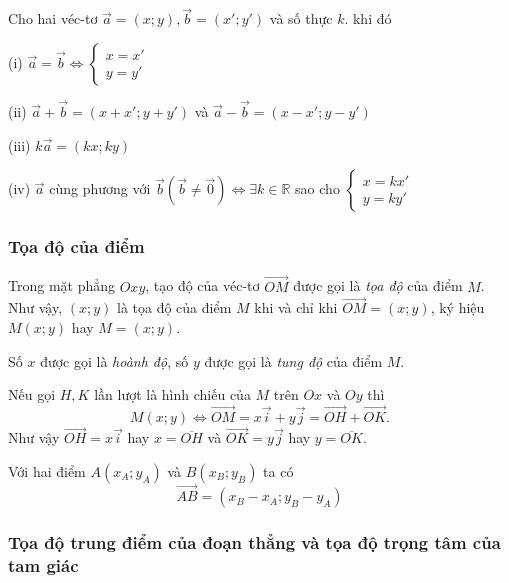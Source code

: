 \begin{dl}
	Cho hai véc-tơ $\overrightarrow{a}=(x;y), \overrightarrow{b}=(x';y')$ và số thực $k$. khi đó
	
	(i) $\overrightarrow{a}=\overrightarrow{b} \Leftrightarrow \begin{cases}
	x=x' \\ y=y'
	\end{cases}$
	
	(ii) $\overrightarrow{a}+ \overrightarrow{b}=(x+x';y+y')$ và $\overrightarrow{a}- \overrightarrow{b}=(x-x';y-y')$
	
	(iii) $k \overrightarrow{a} = (kx;ky)$
	
	(iv) $\overrightarrow{a}$ cùng phương với $\overrightarrow{b} (\overrightarrow{b} \ne \overrightarrow{0}) \Leftrightarrow \exists k \in \mathbb{R}$ sao cho $\begin{cases}
	x=kx' \\ y = ky'
	\end{cases}$
\end{dl}

\subsubsection*{Tọa độ của điểm}
Trong mặt phẳng $Oxy$, tạo độ của véc-tơ $\overrightarrow{OM}$ được gọi là \textit{tọa độ} của điểm $M$. Như vậy, $(x;y)$ là tọa độ của điểm $M$ khi và chỉ khi $\overrightarrow{OM}=(x;y)$, ký hiệu $M(x;y)$ hay $M=(x;y).$

Số $x$ được gọi là \textit{hoành độ}, số $y$ được gọi là \textit{tung độ} của điểm $M$.

\begin{note}
	Nếu gọi $H,K$ lần lượt là hình chiếu của $M$ trên $Ox$ và $Oy$ thì $$M(x;y) \Leftrightarrow \overrightarrow{OM} = x \overrightarrow{i} +y\overrightarrow{j} = \overrightarrow{OH}+ \overrightarrow{OK}.$$ Như vậy $\overrightarrow{OH} = x \overrightarrow{i}$ hay $x= \overline{OH}$ và $\overrightarrow{OK}=y \overrightarrow{j}$ hay $y=\overline{OK}$.
\end{note}

\begin{dl}
	Với hai điểm $A(x_A;y_A)$ và $B(x_B;y_B)$ ta có $$\overrightarrow{AB} = (x_B-x_A; y_B-y_A)$$
\end{dl}

\subsubsection*{Tọa độ trung điểm của đoạn thẳng và tọa độ trọng tâm của tam giác}

